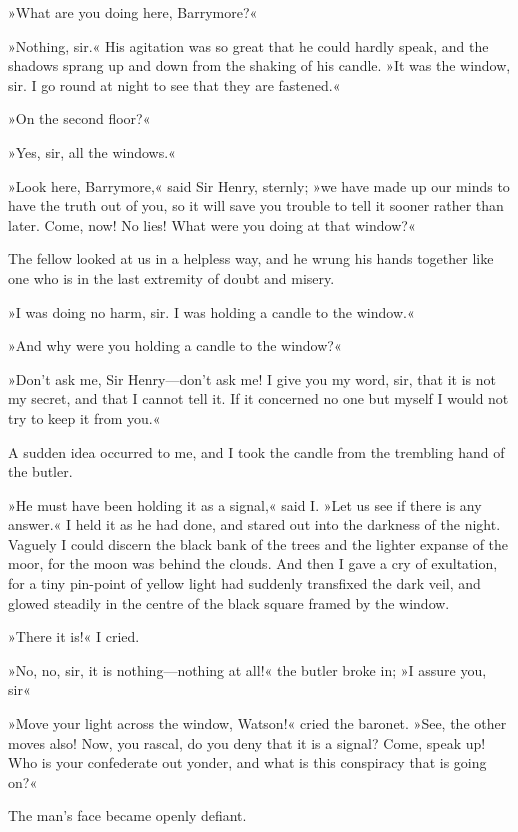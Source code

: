 »What are you doing here, Barrymore?«

»Nothing, sir.« His agitation was so great that he could hardly speak, and the shadows sprang up and down from the shaking of his candle. »It was the window, sir. I go round at night to see that they are fastened.«

»On the second floor?«

»Yes, sir, all the windows.«

»Look here, Barrymore,« said Sir Henry, sternly; »we have made up our minds to have the truth out of you, so it will save you trouble to tell it sooner rather than later. Come, now! No lies! What were you doing at that window?«

The fellow looked at us in a helpless way, and he wrung his hands together like one who is in the last extremity of doubt and misery.

»I was doing no harm, sir. I was holding a candle to the window.«

»And why were you holding a candle to the window?«

»Don't ask me, Sir Henry\allowbreak---\allowbreak don't ask me! I give you my word, sir, that it is not my secret, and that I cannot tell it. If it concerned no one but myself I would not try to keep it from you.«

A sudden idea occurred to me, and I took the candle from the trembling hand of the butler.

»He must have been holding it as a signal,« said I. »Let us see if there is any answer.« I held it as he had done, and stared out into the darkness of the night. Vaguely I could discern the black bank of the trees and the lighter expanse of the moor, for the moon was behind the clouds. And then I gave a cry of exultation, for a tiny pin-point of yellow light had suddenly transfixed the dark veil, and glowed steadily in the centre of the black square framed by the window.

»There it is!« I cried.

»No, no, sir, it is nothing\allowbreak---\allowbreak nothing at all!« the butler broke in; »I assure you, sir\longdash «

»Move your light across the window, Watson!« cried the baronet. »See, the other moves also! Now, you rascal, do you deny that it is a signal? Come, speak up! Who is your confederate out yonder, and what is this conspiracy that is going on?«

The man's face became openly defiant.


